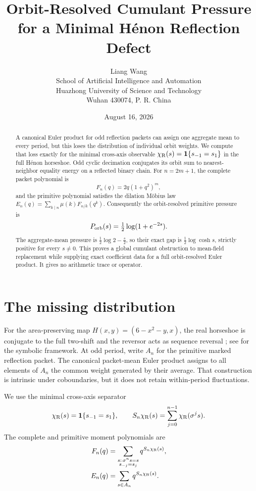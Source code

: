 \documentclass[11pt]{article}
\title{Orbit-Resolved Cumulant Pressure\\for a Minimal H\'enon Reflection Defect}
\author{Liang Wang\\\small School of Artificial Intelligence and Automation\\\small Huazhong University of Science and Technology\\\small Wuhan 430074, P. R. China}
\date{August 16, 2026}
\newcommand{\chiR}{\chi_{\rm R}}
\begin{document}
\maketitle

\begin{abstract}
A canonical Euler product for odd reflection packets can assign one aggregate
mean to every period, but this loses the distribution of individual orbit
weights.  We compute that loss exactly for the minimal cross-axis observable
$\chi_{\rm R}(s)=\mathbf1\{s_{-1}=s_1\}$ in the full H\'enon horseshoe.
Odd cyclic decimation conjugates its orbit sum to nearest-neighbor equality
energy on a reflected binary chain.  For $n=2m+1$, the complete packet
polynomial is
\[
 F_n(q)=2q(1+q^2)^m,
\]
and the primitive polynomial satisfies the dilation M\"obius law
$E_n(q)=\sum_{k\mid n}\mu(k)F_{n/k}(q^k)$.  Consequently the
orbit-resolved primitive pressure is
\[
 P_{\rm orb}(s)=\tfrac12\log(1+e^{-2s}).
\]
The aggregate-mean pressure is $\frac12\log2-\frac s2$, so their exact gap is
$\frac12\log\cosh s$, strictly positive for every $s\ne0$.  This proves a
global cumulant obstruction to mean-field replacement while supplying exact
coefficient data for a full orbit-resolved Euler product.  It gives no
arithmetic trace or operator.
\end{abstract}

\section{The missing distribution}

For the area-preserving map $H(x,y)=(6-x^2-y,x)$, the real horseshoe is
conjugate to the full two-shift and the reversor acts as sequence reversal
\cite{DevaneyNitecki1979,Arai2007}; see \citet{LindMarcus1995} for the
symbolic framework.  At odd period, write $A_n$ for the primitive marked
reflection packet.  The canonical packet-mean Euler product assigns to all
elements of $A_n$ the common weight generated by their average.  That
construction is intrinsic under coboundaries, but it does not retain
within-period fluctuations.

We use the minimal cross-axis separator
\begin{equation}\label{eq:chi}
 \chiR(s)=\mathbf1\{s_{-1}=s_1\},\qquad
 S_n\chiR(s)=\sum_{j=0}^{n-1}\chiR(\sigma^js).
\end{equation}
The complete and primitive moment polynomials are
\begin{align}
 F_n(q)&=\sum_{\substack{s:\,\sigma^ns=s\\s_{-j}=s_j}}
 q^{S_n\chiR(s)},\label{eq:Fdef}\\
 E_n(q)&=\sum_{s\in A_n}q^{S_n\chiR(s)}.\label{eq:Edef}
\end{align}
\end{document}
